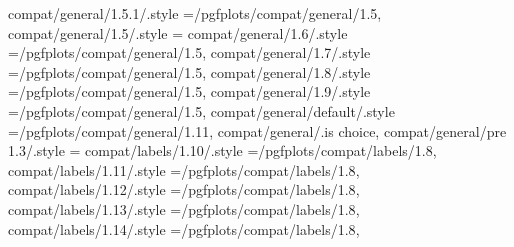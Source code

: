 {{{{{{{{{{{{{compat/general/1.5.1/.style                                        ={/pgfplots/compat/general/1.5},                                                                                                   
compat/general/1.5/.style                                          ={                                                                                                                                  
compat/general/1.6/.style                                          ={/pgfplots/compat/general/1.5},                                                                                                   
compat/general/1.7/.style                                          ={/pgfplots/compat/general/1.5},                                                                                                   
compat/general/1.8/.style                                          ={/pgfplots/compat/general/1.5},                                                                                                   
compat/general/1.9/.style                                          ={/pgfplots/compat/general/1.5},                                                                                                   
compat/general/default/.style                                      ={/pgfplots/compat/general/1.11},                                                                                                   
compat/general/.is choice,
compat/general/pre 1.3/.style                                      ={                                                                                                                                  
compat/labels/1.10/.style                                          ={/pgfplots/compat/labels/1.8},                                                                                                    
compat/labels/1.11/.style                                          ={/pgfplots/compat/labels/1.8},                                                                                                    
compat/labels/1.12/.style                                          ={/pgfplots/compat/labels/1.8},                                                                                                    
compat/labels/1.13/.style                                          ={/pgfplots/compat/labels/1.8},                                                                                                    
compat/labels/1.14/.style                                          ={/pgfplots/compat/labels/1.8},                                                                                                    
}}}}}}}}}}}}}}}
